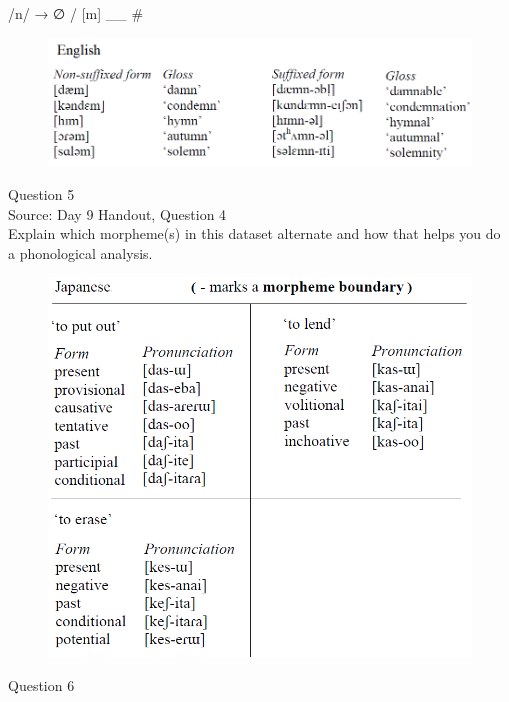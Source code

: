 \documentclass[12pt]{article}
\begin{document}
/n/ → ∅ / {[m]} \_\_ \#

\begin{figure}[H]
\includegraphics{../images/english_stemalternations.png}
\end{figure}

\newpage

{\large Question 5}\\

Source: Day 9 Handout, Question 4\\

Explain which morpheme(s) in this dataset alternate and how that helps you do a phonological analysis.\\

\begin{figure}[H]
\includegraphics{../images/japanese_verbs.png}
\end{figure}

\newpage

{\large Question 6}\\
\end{document}
